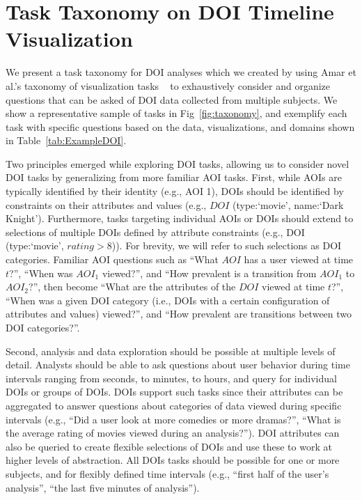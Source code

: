 \section{Task Taxonomy on DOI Timeline Visualization}
\label{sec:Taxonomy}

We present a task taxonomy for DOI analyses which we created by using Amar et al.'s taxonomy of visualization tasks ~\cite{amar2005low} to exhaustively consider and organize questions that can be asked of DOI data collected from multiple subjects. We show a representative sample of tasks in Fig~\ref{fig:taxonomy}, and exemplify each task with specific questions based on the data, visualizations, and domains shown in Table~\ref{tab:ExampleDOI}. 
 
Two principles emerged while exploring DOI tasks, allowing us to consider novel DOI tasks by generalizing from more familiar AOI tasks. First, while AOIs are typically identified by their identity (e.g., AOI 1), DOIs should be identified by constraints on their attributes and values (e.g., $DOI$ (type:`movie', name:`Dark Knight'). Furthermore, tasks targeting individual AOIs or DOIs should extend to selections of multiple DOIs defined by attribute constraints (e.g., DOI (type:`movie', $rating>8$)). For brevity, we will refer to such selections as DOI categories. Familiar AOI questions such as ``What $AOI$ has a user viewed at time $t$?'', ``When was $AOI_1$ viewed?'', and ``How prevalent is a transition from $AOI_1$ to $AOI_2$?'', then become ``What are the attributes of the $DOI$ viewed at time $t$?'', ``When was a given DOI category (i.e., DOIs with a certain configuration of attributes and values) viewed?'', and ``How prevalent are transitions between two DOI categories?''.  

Second, analysis and data exploration should be possible at multiple levels of detail. Analysts should be able to ask questions about user behavior during time intervals ranging from seconds, to minutes, to hours, and query for individual DOIs or groups of DOIs. DOIs support such tasks since their attributes can be aggregated to answer questions about categories of data viewed during specific intervals (e.g., ``Did a user look at more comedies or more dramas?'', ``What is the average rating of movies viewed during an analysis?''). DOI attributes can also be queried to create flexible selections of DOIs and use these to work at higher levels of abstraction. All DOIs tasks should be possible for one or more subjects, and for flexibly defined time intervals (e.g., ``first half of the user's analysis'', ``the last five minutes of analysis'').

